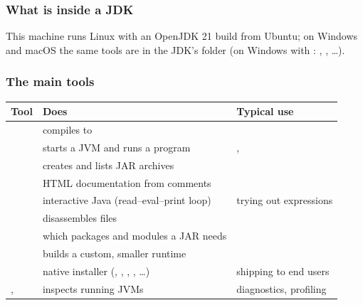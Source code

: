 \documentclass[aspectratio=169,10pt,compress]{beamer}
\begin{document}
\begin{frame}[t,fragile] \frametitle{What is inside a JDK}

  \vspace{0.1em}
  \small
  This machine runs Linux with an OpenJDK 21 build from Ubuntu; 
  on Windows and macOS the same tools are in the JDK's
   folder (on Windows with : , , \dots).
\end{frame}




\begin{frame}[t,fragile] \frametitle{The main tools}
  \footnotesize
  \begin{tabular}{@{}L{0.13\textwidth}L{0.37\textwidth}L{0.44\textwidth}@{}}
    \toprule
    \textbf{Tool} & \textbf{Does} & \textbf{Typical use} \\
    \midrule
         & compiles  to        &  \\
          & starts a JVM and runs a program             & ,  \\
           & creates and lists JAR archives              &  \\
       & HTML documentation from comments            &  \\
        & interactive Java (read--eval--print loop)  & trying out expressions \\
         & disassembles  files          &  \\
         & which packages and modules a JAR needs      &  \\
         & builds a custom, smaller runtime            &  \\
      & native installer (, , , , \dots) & shipping to end users \\
    ,  & inspects running JVMs              & diagnostics, profiling \\
    \bottomrule
  \end{tabular}
\end{frame}
\end{document}
